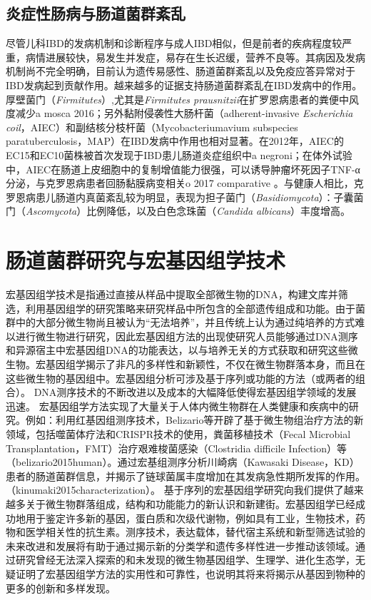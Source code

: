 \subsection{炎症性肠病与肠道菌群紊乱}
尽管儿科IBD的发病机制和诊断程序与成人IBD相似，但是前者的疾病程度较严重，病情进展较快，易发生并发症，易存在生长迟缓，营养不良等。其病因及发病机制尚不完全明确，目前认为遗传易感性、肠道菌群紊乱以及免疫应答异常对于IBD发病起到贡献作用\cite{J Liang     }。越来越多的证据支持肠道菌群紊乱在IBD发病中的作用。厚壁菌门（\textit{Firmitutes}）,尤其是\textit{Firmitutes prausnitzii}在扩罗恩病患者的粪便中风度减少{a mosca 2016}；另外黏附侵袭性大肠杆菌（adherent-invasive \textit{Escherichia
coil}，AIEC）和副结核分枝杆菌（Mycobacteriumavium subspecies paratuberculosis，MAP）在IBD发病中作用也相对显著。在2012年，AIEC的EC15和EC10菌株被首次发现于IBD患儿肠道炎症组织中{a negroni}；在体外试验中，AIEC在肠道上皮细胞中的复制增值能力很强，可以诱导肿瘤坏死因子TNF-α分泌，与克罗恩病患者回肠黏膜病变相关{o 2017 comparative }。与健康人相比，克罗恩病患儿肠道内真菌紊乱较为明显，表现为担子菌门（\textit{Basidiomycota}）：子囊菌门（\textit{Ascomycota}）比例降低，以及白色念珠菌（\textit{Candida albicans}）丰度增高\cite{h sokol}。
\\
\section{肠道菌群研究与宏基因组学技术}
宏基因组学技术是指通过直接从样品中提取全部微生物的DNA，构建文库并筛选，利用基因组学的研究策略来研究样品中所包含的全部遗传组成和功能。由于菌群中的大部分微生物尚且被认为“无法培养”，并且传统上认为通过纯培养的方式难以进行微生物进行研究，因此宏基因组方法的出现使研究人员能够通过DNA测序和异源宿主中宏基因组DNA的功能表达，以与培养无关的方式获取和研究这些微生物。宏基因组学揭示了非凡的多样性和新颖性，不仅在微生物群落本身，而且在这些微生物的基因组中。宏基因组分析可涉及基于序列或功能的方法（或两者的组合）。 DNA测序技术的不断改进以及成本的大幅降低使得宏基因组学领域的发展迅速。
宏基因组学方法实现了大量关于人体内微生物群在人类健康和疾病中的研究。例如：利用红基因组测序技术，Belizario等开辟了基于微生物组治疗方法的新领域，包括噬菌体疗法和CRISPR技术的使用，粪菌移植技术（Fecal Microbial Transplantation，FMT）治疗艰难梭菌感染（Clostridia difficile Infection）等（belizario2015human）。通过宏基组测序分析川崎病（Kawasaki Disease，KD）患者的肠道菌群信息，并揭示了链球菌属丰度增加在其发病急性期所发挥的作用。（kinumaki2015characterization）。
基于序列的宏基因组学研究向我们提供了越来越多关于微生物群落组成，结构和功能能力的新认识和新建街。宏基因组学已经成功地用于鉴定许多新的基因，蛋白质和次级代谢物，例如具有工业，生物技术，药物和医学相关性的抗生素。测序技术，表达载体，替代宿主系统和新型筛选试验的未来改进和发展将有助于通过揭示新的分类学和遗传多样性进一步推动该领域。通过研究曾经无法深入探索的和未发现的微生物基因组学、生理学、进化生态学，无疑证明了宏基因组学方法的实用性和可靠性，也说明其将来将揭示从基因到物种的更多的创新和多样发现。

